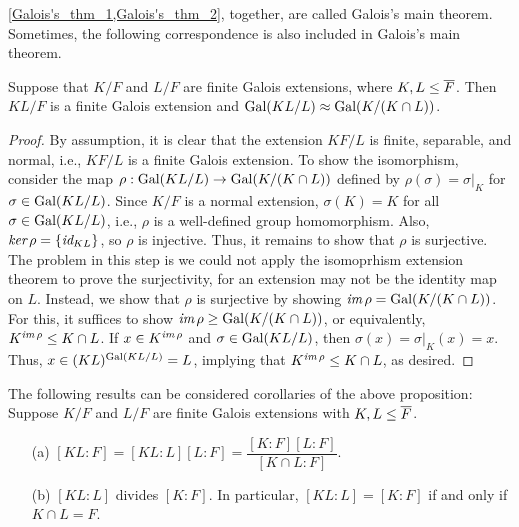 \cref{Galois's_thm_1,Galois's_thm_2}, together, are called Galois's main theorem.
Sometimes, the following correspondence is also included in Galois's main theorem.
\begin{prop}
    Suppose that $K/F$ and $L/F$ are finite Galois extensions, where $K, L\leq\overline{F}$.
    Then $KL/F$ is a finite Galois extension and ${\textrm{Gal}({KL/L})}\approx{\textrm{Gal}({K/(K\cap L)})}$.
\end{prop}
\begin{proof}
    By assumption, it is clear that the extension $KF/L$ is finite, separable, and normal, i.e., $KF/L$ is a finite Galois extension.
    To show the isomorphism, consider the map $\rho: {\textrm{Gal}({KL/L})}\rightarrow{\textrm{Gal}({K/(K\cap L)})}$ defined by $\rho(\sigma)=\sigma|_K$ for $\sigma\in{\textrm{Gal}({KL/L})}$.
    Since $K/F$ is a normal extension, $\sigma(K)=K$ for all $\sigma\in{\textrm{Gal}({KL/L})}$, i.e., $\rho$ is a well-defined group homomorphism.
    Also, $\textit{ker\,}\rho=\{\textit{id}_{KL}\}$, so $\rho$ is injective.
    Thus, it remains to show that $\rho$ is surjective.
    \color{magenta}The problem in this step is we could not apply the isomoprhism extension theorem to prove the surjectivity, for an extension may not be the identity map on $L$. \color{black}
    Instead, we show that $\rho$ is surjective by showing $\textit{im\,}\rho={\textrm{Gal}({K/(K\cap L)})}$.
    For this, it suffices to show $\textit{im\,}\rho\geq{\textrm{Gal}({K/(K\cap L)})}$, or equivalently, $K^{\textit{im\,}\rho}\leq K\cap L$.
    If $x\in K^{\textit{im\,}\rho}$ and $\sigma\in{\textrm{Gal}({KL/L})}$, then $\sigma(x)=\sigma|_K(x)=x$.
    Thus, $x\in(KL)^{\textrm{Gal}({KL/L})}=L$, implying that $K^{\textit{im\,}\rho}\leq K\cap L$, as desired.
\end{proof}
\begin{rmk}
    The following results can be considered corollaries of the above proposition: Suppose $K/F$ and $L/F$ are finite Galois extensions with $K, L\leq \overline{F}$.
    \begin{enumerate}
        \item[(a)]
        {
                $[KL:F]=[KL:L][L:F]=\dfrac{[K:F][L:F]}{[K\cap L:F]}$.
        }
        \item[(b)]
        {
                $[KL:L]$ divides $[K:F]$.
                In particular, $[KL:L]=[K:F]$ if and only if $K\cap L=F$.
        }
    \end{enumerate}
\end{rmk}
